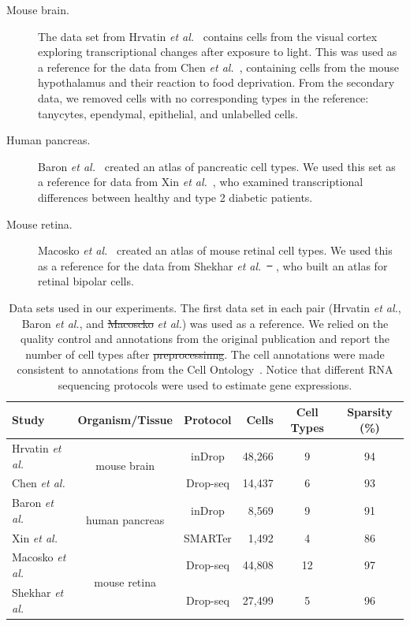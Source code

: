 \documentclass[runningheads]{llncs}
\newcommand{\etal}{\textit{et al.}}
\providecommand{\DIFaddtex}[1]{{\protect\color{blue}\uwave{#1}}} %
\providecommand{\DIFdeltex}[1]{{\protect\color{red}\sout{#1}}}                      %
\providecommand{\DIFaddbegin}{} %
\providecommand{\DIFaddend}{} %
\providecommand{\DIFdelbegin}{} %
\providecommand{\DIFdelend}{} %
\providecommand{\DIFaddFL}[1]{\DIFadd{#1}} %
\providecommand{\DIFdelFL}[1]{\DIFdel{#1}} %
\providecommand{\DIFaddbeginFL}{} %
\providecommand{\DIFaddendFL}{} %
\providecommand{\DIFdelbeginFL}{} %
\providecommand{\DIFdelendFL}{} %
\providecommand{\DIFadd}[1]{\texorpdfstring{\DIFaddtex{#1}}{#1}} %
\providecommand{\DIFdel}[1]{\texorpdfstring{\DIFdeltex{#1}}{}} %
\newcommand{\DIFscaledelfig}{0.5}
\newlength{\DIFdelgraphicswidth} %
\newlength{\DIFdelgraphicsheight} %
\newcommand{\DIFaddincludegraphics}[2][]{{\color{blue}\fbox{\DIFOincludegraphics[#1]{#2}}}} %
\newcommand{\DIFdelincludegraphics}[2][]{%
\sbox{\DIFdelgraphicsbox}{\DIFOincludegraphics[#1]{#2}}%
\settoboxwidth{\DIFdelgraphicswidth}{\DIFdelgraphicsbox} %
\settoboxtotalheight{\DIFdelgraphicsheight}{\DIFdelgraphicsbox} %
\scalebox{\DIFscaledelfig}{%
\parbox[b]{\DIFdelgraphicswidth}{\usebox{\DIFdelgraphicsbox}\\[-\baselineskip] \rule{\DIFdelgraphicswidth}{0em}}\llap{\resizebox{\DIFdelgraphicswidth}{\DIFdelgraphicsheight}{%
\setlength{\unitlength}{\DIFdelgraphicswidth}%
\begin{picture}(1,1)%
\thicklines\linethickness{2pt} %
{\color[rgb]{1,0,0}\put(0,0){\framebox(1,1){}}}%
{\color[rgb]{1,0,0}\put(0,0){\line( 1,1){1}}}%
{\color[rgb]{1,0,0}\put(0,1){\line(1,-1){1}}}%
\end{picture}%
}\hspace*{3pt}}} %
} %
\DeclareRobustCommand{\DIFaddbegin}{\DIFOaddbegin \let\includegraphics\DIFaddincludegraphics} %
\DeclareRobustCommand{\DIFaddend}{\DIFOaddend \let\includegraphics\DIFOincludegraphics} %
\DeclareRobustCommand{\DIFdelbegin}{\DIFOdelbegin \let\includegraphics\DIFdelincludegraphics} %
\DeclareRobustCommand{\DIFdelend}{\DIFOaddend \let\includegraphics\DIFOincludegraphics} %
\DeclareRobustCommand{\DIFaddbeginFL}{\DIFOaddbeginFL \let\includegraphics\DIFaddincludegraphics} %
\DeclareRobustCommand{\DIFaddendFL}{\DIFOaddendFL \let\includegraphics\DIFOincludegraphics} %
\DeclareRobustCommand{\DIFdelbeginFL}{\DIFOdelbeginFL \let\includegraphics\DIFdelincludegraphics} %
\DeclareRobustCommand{\DIFdelendFL}{\DIFOaddendFL \let\includegraphics\DIFOincludegraphics} %
\begin{document}
\begin{description}
\item[Mouse brain.] The data set from Hrvatin \etal~\cite{Hrvatin2018} contains
cells from the visual cortex exploring transcriptional changes after exposure
to light. This was used as a reference for the data from Chen
\etal~\cite{Chen2017}, containing cells from the mouse hypothalamus and
their reaction to food deprivation. From the secondary data, we removed cells
with no corresponding types in the reference: tanycytes, ependymal,
epithelial, and unlabelled cells.

\item[Human pancreas.] Baron \etal~\cite{Baron2016} created
an atlas of pancreatic cell types. We used this set as a reference
for data from Xin \etal~\cite{Xin2016}, who examined transcriptional
differences between healthy and type 2 diabetic patients.

\item[Mouse retina.] Macosko \etal~\cite{Macosko2015} created
an atlas of mouse retinal cell types. We used this as a reference
for the data from Shekhar \etal~\DIFdelbegin \DIFdel{\mbox{%
\cite{Sekhar2016}}\hskip0pt%
}\DIFdelend \DIFaddbegin \DIFadd{\mbox{%
\cite{Shekhar2016}}\hskip0pt%
}\DIFaddend , who built an atlas for
retinal bipolar cells.
\end{description}

\vspace{-3mm}
\begin{table}[ht]
\begin{center}
\setlength\tabcolsep{4pt}
\begin{tabular}{l c c r c c}
\toprule
Study & Organism/Tissue & Protocol & Cells & Cell Types & Sparsity (\%) \\
\midrule
Hrvatin \etal & \multirow{2}{*}{mouse brain} & inDrop & 48,266 & 9 & 94 \\
Chen \etal & & Drop-seq & 14,437 & 6 & 93 \\[5pt]
Baron \etal & \multirow{2}{*}{human pancreas} & inDrop & 8,569 & 9 & 91 \\
Xin \etal & & SMARTer & 1,492 & 4 & 86 \\[5pt]
Macosko \etal & \multirow{2}{*}{mouse retina} & Drop-seq & 44,808 & 12 & 97 \\
Shekhar \etal & & Drop-seq & 27,499 & 5 & 96 \\
\bottomrule
\end{tabular}
\end{center}
\caption{Data sets used in our experiments. The first data set in each pair
(Hrvatin \etal, Baron \etal, and \DIFdelbeginFL \DIFdelFL{Macoscko }\DIFdelendFL \DIFaddbeginFL \DIFaddFL{Macosko }\DIFaddendFL \etal) was used as a reference.  We
relied on the quality control and annotations from the original publication
and report the number of cell types after \DIFdelbeginFL \DIFdelFL{preprocessinng}\DIFdelendFL \DIFaddbeginFL \DIFaddFL{preprocessing}\DIFaddendFL .  The cell
annotations were made consistent to annotations from the Cell
Ontology~\cite{Bard2005}. Notice that different RNA sequencing protocols
were used to estimate gene expressions.}
\label{tab:data sets}
\end{table}
\end{document}
